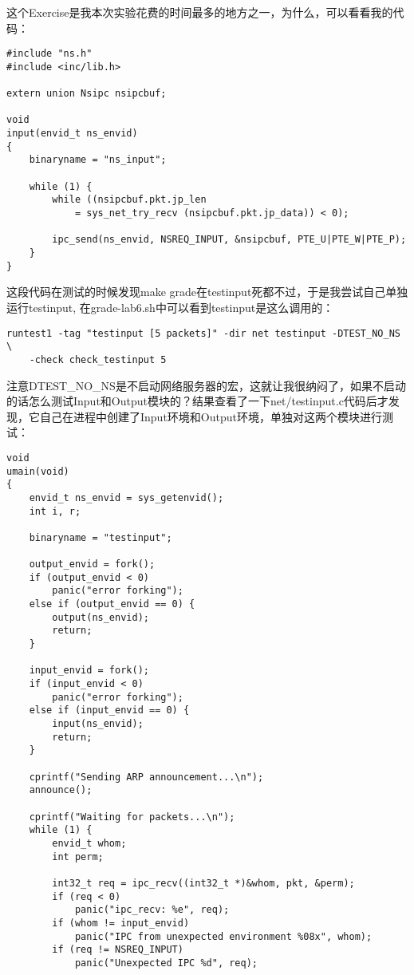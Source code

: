 \documentclass{article}
\begin{document}
\begin{CJK*}{UTF8}{gkai}
这个Exercise是我本次实验花费的时间最多的地方之一，为什么，可以看看我的代码：

\begin{lstlisting}[style=ccode, title={\scriptsize \ttfamily \bfseries net/input.c}]
#include "ns.h"
#include <inc/lib.h>

extern union Nsipc nsipcbuf;

void
input(envid_t ns_envid)
{
    binaryname = "ns_input";

    while (1) {
        while ((nsipcbuf.pkt.jp_len 
            = sys_net_try_recv (nsipcbuf.pkt.jp_data)) < 0);

        ipc_send(ns_envid, NSREQ_INPUT, &nsipcbuf, PTE_U|PTE_W|PTE_P);     
    }
}
\end{lstlisting}

这段代码在测试的时候发现make grade在testinput死都不过，于是我尝试自己单独运行testinput, 在grade-lab6.sh中可以看到testinput是这么调用的：

\begin{lstlisting}[style=console]
runtest1 -tag "testinput [5 packets]" -dir net testinput -DTEST_NO_NS \
	-check check_testinput 5
\end{lstlisting}

注意DTEST\_NO\_NS是不启动网络服务器的宏，这就让我很纳闷了，如果不启动的话怎么测试Input和Output模块的？结果查看了一下net/testinput.c代码后才发现，它自己在进程中创建了Input环境和Output环境，单独对这两个模块进行测试：

\begin{lstlisting}[style=ccode, title={\scriptsize \ttfamily \bfseries kern/e100.c}]
void
umain(void)
{
	envid_t ns_envid = sys_getenvid();
	int i, r;

	binaryname = "testinput";

	output_envid = fork();
	if (output_envid < 0)
		panic("error forking");
	else if (output_envid == 0) {
		output(ns_envid);
		return;
	}

	input_envid = fork();
	if (input_envid < 0)
		panic("error forking");
	else if (input_envid == 0) {
		input(ns_envid);
		return;
	}

	cprintf("Sending ARP announcement...\n");
	announce();

	cprintf("Waiting for packets...\n");
	while (1) {
		envid_t whom;
		int perm;

		int32_t req = ipc_recv((int32_t *)&whom, pkt, &perm);
		if (req < 0)
			panic("ipc_recv: %e", req);
		if (whom != input_envid)
			panic("IPC from unexpected environment %08x", whom);
		if (req != NSREQ_INPUT)
			panic("Unexpected IPC %d", req);


\end{lstlisting}
\end{CJK*}
\end{document}
